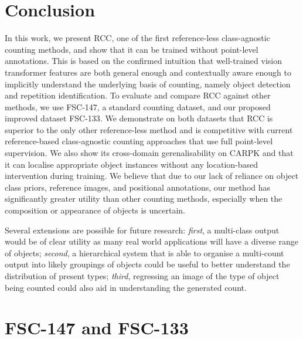 \documentclass[letterpaper, 11pt]{IEEEtran}
\begin{document}
\section{Conclusion}
\label{conclusion}
In this work, we present RCC, one of the first reference-less class-agnostic counting methods,
and show that it can be trained without point-level annotations.
This is based on the confirmed intuition that well-trained vision transformer features are both general enough and contextually aware enough to implicitly understand the underlying basis of counting, namely object detection and repetition identification. 
To evaluate and compare RCC against other methods, we use FSC-147, a standard counting dataset, and our proposed improved dataset FSC-133.
We demonstrate on both datasets that RCC is superior to the only other reference-less method and is competitive with current reference-based class-agnostic counting approaches that use full point-level supervision. We also show its cross-domain gerenalisability on CARPK and that it can localise appropriate object instances without any location-based intervention during training.
We believe that due to our lack of reliance on object class priors, reference images, and positional annotations, our method has significantly greater utility than other counting methods, especially when the composition or appearance of objects is uncertain.


Several extensions are possible for future research: \textit{first}, a multi-class output would be of clear utility as many real world applications will have a diverse range of objects; \textit{second}, a hierarchical system that is able to organise a multi-count output into likely groupings of objects could be useful to better understand the distribution of present types; \textit{third}, regressing an image of the type of object being counted could also aid in understanding the generated count.
\clearpage


\clearpage
\onecolumn
\appendices
\section{FSC-147 and FSC-133}
\end{document}
